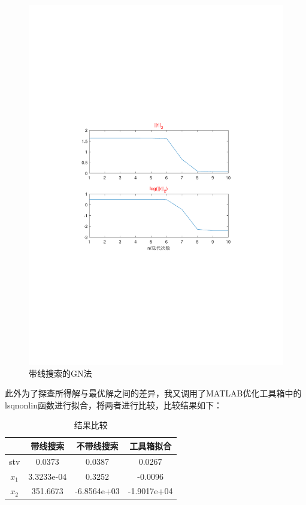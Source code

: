 \begin{figure}[H]
\centering
\includegraphics[width=12cm]{fig/6_4.pdf}
\caption{带线搜索的GN法}
\end{figure}

此外为了探查所得解与最优解之间的差异，我又调用了MATLAB优化工具箱中的lsqnonlin函数进行拟合，将两者进行比较，比较结果如下：

\begin{table}[H]
\centering
\caption{结果比较}
	\begin{tabular}{cccc}
	\toprule
	{}&带线搜索&不带线搜索&工具箱拟合\\
	\midrule
	stv&	0.0373	&0.0387&0.0267\\
	$x_1$&	3.3233e-04	&0.3252&-0.0096\\
	$x_2$&351.6673		&-6.8564e+03&-1.9017e+04\\
	\bottomrule
	\end{tabular}
\end{table}

